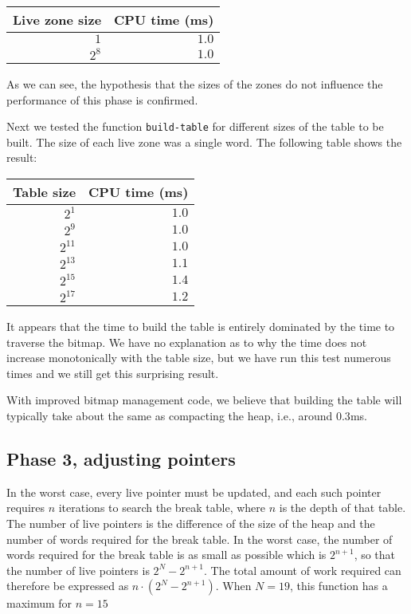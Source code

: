 \begin{tabular}{|r|r|}
\hline
Live zone size & CPU time (ms)\\
\hline
$1$ & $1.0$\\
$2^8$ & $1.0$\\
\hline
\end{tabular}

As we can see, the hypothesis that the sizes of the zones do not
influence the performance of this phase is confirmed.  

Next we tested the function \texttt{build-table} for different sizes
of the table to be built.  The size of each live zone was a single
word.  The following table shows the result:

\begin{tabular}{|r|r|}
\hline
Table size & CPU time (ms)\\
\hline
$2^{1}$ & $1.0$\\
$2^{9}$ & $1.0$\\
$2^{11}$ & $1.0$\\
$2^{13}$ & $1.1$\\
$2^{15}$ & $1.4$\\
$2^{17}$ & $1.2$\\
\hline
\end{tabular}

It appears that the time to build the table is entirely dominated by
the time to traverse the bitmap.  We have no explanation as to why the
time does not increase monotonically with the table size, but we have
run this test numerous times and we still get this surprising result.  

With improved bitmap management code, we believe that building the
table will typically take about the same as compacting the heap, i.e.,
around $0.3$ms. 

\subsection{Phase 3, adjusting pointers}

In the worst case, every live pointer must be updated, and each such
pointer requires $n$ iterations to search the break table, where $n$
is the depth of that table.  The number of live pointers is the
difference of the size of the heap and the number of words required
for the break table.  In the worst case, the number of words required
for the break table is as small as possible which is $2^{n+1}$, so
that the number of live pointers is $2^N - 2^{n+1}$.  The total amount
of work required can therefore be expressed as $n \cdot (2^N -
2^{n+1})$.  When $N = 19$, this function has a maximum for $n = 15$

